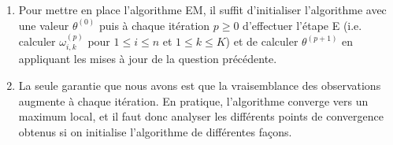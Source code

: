 \documentclass[a4paper,10pt,fleqn]{article}
\newcommand{\1}{\ensuremath{\mathbbm{1}}}
\begin{document}
\begin{enumerate}
\begin{enumerate}
$$
\partial_{\pi_k}Q(\theta;\theta^{(p)}) = \sum_{i=1}^n \left\{\frac{\omega_{i,k}^{(p)}(X_i)}{\pi_k} - \frac{\omega_{i,k}^{(p)}(X_i)}{\pi_K}\right\}
$$
et on en d\'eduit que $k\mapsto\sum_{i=1}^n\omega_{i,k}^{(p)}(X_i)/\pi_k$ est constante. En utilisant par ailleurs que  $\sum_{k=1}^{K}\pi_k = 1$ et $\sum_{k=1}^{K}\omega_{i,k}^{(p)}(X_i)= 1$, on a
$$
\pi_k^{(p+1)} = \frac{1}{n}\sum_{i=1}^n\omega_{i,k}^{(p)}(X_i)\,.
$$
\item Pour mettre en place l'algorithme EM, il suffit d'initialiser l'algorithme avec une valeur $\theta^{(0)}$ puis \`a chaque it\'eration $p\geq 0$ d'effectuer l'\'etape E (i.e. calculer $\omega_{i,k}^{(p)}$ pour $1\leq i \leq n$ et $1\leq k \leq K$) et de calculer $\theta^{(p+1)}$ en appliquant les mises \`a jour de la question pr\'ec\'edente.
\item La seule garantie que nous avons est que la vraisemblance des observations augmente \`a chaque it\'eration. En pratique, l'algorithme converge vers un maximum local, et il faut donc analyser les diff\'erents points de convergence obtenus si on initialise l'algorithme de diff\'erentes fa\c cons. 
\end{enumerate}
\end{enumerate}
\end{document}
